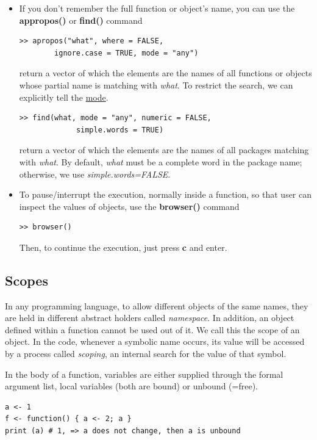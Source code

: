 \begin{itemize}
\item If you don't remember the full function or object's name, you can use the
  {\bf appropos()} or {\bf find()} command
\begin{lstlisting}
>> apropos("what", where = FALSE, 
        ignore.case = TRUE, mode = "any")  
\end{lstlisting}
  return a vector of which the elements are the names of all functions
  or objects whose partial name is matching with {\it what}. To
  restrict the search, we can explicitly tell the
  \hyperref[mode]{mode}.

\begin{lstlisting}
>> find(what, mode = "any", numeric = FALSE, 
             simple.words = TRUE)
\end{lstlisting}
return a vector of which the elements are the names of all packages
matching with {\it what}. By default, {\it what} must be a complete
word in the package name; otherwise, we use {\it simple.words=FALSE}.

\item To pause/interrupt the execution, normally inside a function, so
  that user can inspect the values of objects, use the {\bf browser()}
  command
\begin{lstlisting}
>> browser()
\end{lstlisting}
Then, to continue the execution, just press {\bf c} and enter.
\end{itemize}

\subsection{Scopes}
\label{sec:scopes}

In any programming language, to allow different objects of the same
names, they are held in different abstract holders called
{\it namespace}. In addition, an object defined within a function
cannot be used out of it. We call this the scope of an object.  In the
code, whenever a symbolic name occurs, its value will be accessed by a
process called {\it scoping}, an internal search for the value of that
symbol.

In the body of a function, variables are either supplied through the
formal argument list, local variables (both are bound) or unbound
(=free). 
\begin{lstlisting}
a <- 1
f <- function() { a <- 2; a }
print (a) # 1, => a does not change, then a is unbound
\end{lstlisting}

